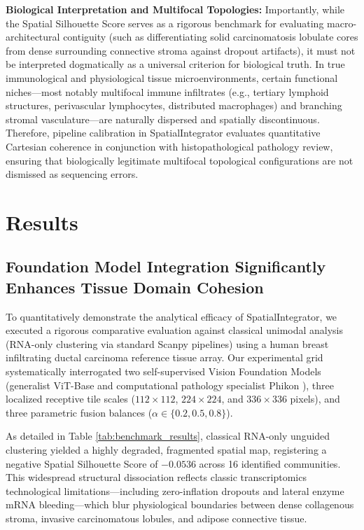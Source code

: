 \documentclass[11pt, a4paper]{article}
\begin{document}
\textbf{Biological Interpretation and Multifocal Topologies:} Importantly, while the Spatial Silhouette Score serves as a rigorous benchmark for evaluating macro-architectural contiguity (such as differentiating solid carcinomatosis lobulate cores from dense surrounding connective stroma against dropout artifacts), it must not be interpreted dogmatically as a universal criterion for biological truth. In true immunological and physiological tissue microenvironments, certain functional niches—most notably multifocal immune infiltrates (e.g., tertiary lymphoid structures, perivascular lymphocytes, distributed macrophages) and branching stromal vasculature—are naturally dispersed and spatially discontinuous. Therefore, pipeline calibration in SpatialIntegrator evaluates quantitative Cartesian coherence in conjunction with histopathological pathology review, ensuring that biologically legitimate multifocal topological configurations are not dismissed as sequencing errors.

\section{Results}

\subsection{Foundation Model Integration Significantly Enhances Tissue Domain Cohesion}
To quantitatively demonstrate the analytical efficacy of SpatialIntegrator, we executed a rigorous comparative evaluation against classical unimodal analysis (RNA-only clustering via standard Scanpy pipelines) using a human breast infiltrating ductal carcinoma reference tissue array. Our experimental grid systematically interrogated two self-supervised Vision Foundation Models (generalist ViT-Base \cite{dosovitskiy2021image} and computational pathology specialist Phikon \cite{filiot2024scaling}), three localized receptive tile scales ($112\times112$, $224\times224$, and $336\times336$ pixels), and three parametric fusion balances ($\alpha \in \{0.2, 0.5, 0.8\}$).

As detailed in Table \ref{tab:benchmark_results}, classical RNA-only unguided clustering yielded a highly degraded, fragmented spatial map, registering a negative Spatial Silhouette Score of $-0.0536$ across 16 identified communities. This widespread structural dissociation reflects classic transcriptomics technological limitations—including zero-inflation dropouts and lateral enzyme mRNA bleeding—which blur physiological boundaries between dense collagenous stroma, invasive carcinomatous lobules, and adipose connective tissue.
\end{document}
